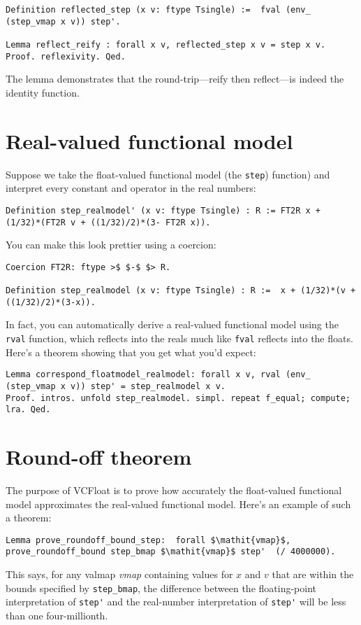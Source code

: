 \documentclass[article]{memoir}
\begin{document}
\begin{lstlisting}
Definition reflected_step (x v: ftype Tsingle) :=  fval (env_ (step_vmap x v)) step'.

Lemma reflect_reify : forall x v, reflected_step x v = step x v.
Proof. reflexivity. Qed.
\end{lstlisting}
The lemma demonstrates that the round-trip---reify then reflect---is indeed
the identity function.

\chapter{Real-valued functional model}

Suppose we take the float-valued functional model (the \lstinline{step}) 
function) and interpret every constant and operator in the real numbers:

\begin{lstlisting}
Definition step_realmodel' (x v: ftype Tsingle) : R := FT2R x + (1/32)*(FT2R v + ((1/32)/2)*(3- FT2R x)).
\end{lstlisting}
You can make this look prettier using a coercion:

\begin{lstlisting}
Coercion FT2R: ftype >$ $-$ $> R.

Definition step_realmodel (x v: ftype Tsingle) : R :=  x + (1/32)*(v + ((1/32)/2)*(3-x)).
\end{lstlisting}

In fact, you can automatically derive a real-valued functional model
using the \lstinline{rval} function, which reflects into the reals
much like \lstinline{fval} reflects into the floats.  Here's
a theorem showing that you get what you'd expect:

\begin{lstlisting}
Lemma correspond_floatmodel_realmodel: forall x v, rval (env_ (step_vmap x v)) step' = step_realmodel x v.
Proof. intros. unfold step_realmodel. simpl. repeat f_equal; compute; lra. Qed. 
\end{lstlisting}

\chapter{Round-off theorem}
The purpose of VCFloat is to prove how accurately the
float-valued functional model approximates the real-valued
functional model.  Here's an example of such a theorem:
 
\begin{lstlisting}
Lemma prove_roundoff_bound_step:  forall $\mathit{vmap}$, prove_roundoff_bound step_bmap $\mathit{vmap}$ step'  (/ 4000000).
\end{lstlisting}
This says, for any valmap \emph{vmap}
containing values for $x$ and $v$
that are within the bounds specified by \lstinline{step_bmap},
the difference between the floating-point
interpretation of \lstinline{step'}
and the real-number interpretation of \lstinline{step'}
will be less than one four-millionth.
\end{document}
